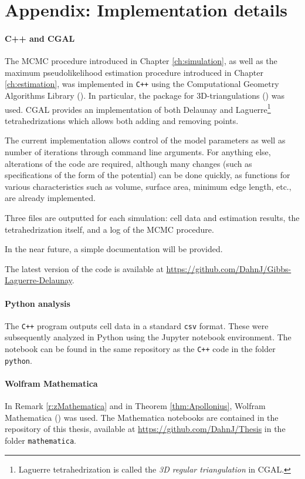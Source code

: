 \chapter{Appendix: Implementation details}\label{appendix:implementation}
\subsubsection{C++ and CGAL}
The MCMC procedure introduced in Chapter \ref{ch:simulation}, as well as the maximum pseudolikelihood estimation procedure introduced in Chapter \ref{ch:estimation}, was implemented in \texttt{C++} using the Computational Geometry Algorithms Library (\cite{cgal}). In particular, the package for 3D-triangulations (\cite{cgal:3d-triang}) was used. CGAL provides an implementation of both Delaunay and Laguerre\footnote{Laguerre tetrahedrization is called the \textit{3D regular triangulation} in CGAL.} tetrahedrizations which allows both adding and removing points. 

The current implementation allows control of the model parameters as well as number of iterations through command line arguments. For anything else, alterations of the code are required, although many changes (such as specifications of the form of the potential) can be done quickly, as functions for various characteristics such as volume, surface area, minimum edge length, etc., are already implemented. 

Three files are outputted for each simulation: cell data and estimation results, the tetrahedrization itself, and a log of the MCMC procedure.

In the near future, a simple documentation will be provided. 

The latest version of the code is available at \url{https://github.com/DahnJ/Gibbs-Laguerre-Delaunay}. 

\subsubsection{Python analysis}
The \texttt{C++} program outputs cell data in a standard \texttt{csv} format. These were subsequently analyzed in Python using the Jupyter notebook environment. The notebook can be found in the same repository as the \texttt{C++} code in the folder \texttt{python}. 


\subsubsection{Wolfram Mathematica}
In Remark \ref{r:zMathematica} and in Theorem \ref{thm:Apollonius}, Wolfram Mathematica (\cite{Mathematica}) was used. The Mathematica notebooks are contained in the repository of this thesis, available at \url{https://github.com/DahnJ/Thesis} in the folder \texttt{mathematica}.


